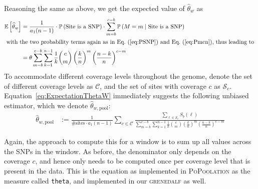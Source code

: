 \documentclass[a4paper,fontsize=9pt,DIV=14]{scrartcl}
\newcommand\toolname{\textsc}
\newcommand\eqnref[1]{Eq.~(\ref{#1})}
\newcommand{\samplesize}{n}
\newcommand{\coverage}{c}
\begin{document}
Reasoning the same as above, we get the expected value of $\widehat{\theta}_w$ as
%
\begin{align}
    \nonumber
    \mathbb{E}\left[\widehat{\theta}_w\right]
    &= \frac{1}{a_1(\samplesize-1)} \cdot \mathbb{P}\left(\text{Site is a SNP}\right)
        \cdot \sum_{m=b}^{\coverage-b} \mathbb{P}\left(M = m \mid \text{Site is a SNP}\right)
    \\
    \intertext{
        with the two probability terms again as in \eqnref{eq:PSNP} and \eqnref{eq:Pmcn}, thus leading to
    }
    \label{eq:ExpectationThetaW}
    &= \theta\sum_{m=b}^{\coverage-b}\sum_{k=1}^{n-1} \frac{1}{k} \binom{\coverage}{m} \left(\frac{k}{\samplesize}\right)^m \left(\frac{\samplesize-k}{\samplesize}\right)^{\coverage-m}
\end{align}
%
To accommodate different coverage levels throughout the genome, denote the set of different coverage levels as $\mathcal{C}$, and the set of sites with coverage $c$ as $\mathcal{S}_c$. Equation~\ref{eq:ExpectationThetaW} immediately suggests the following unbiased estimator, which we denote $\widehat{\theta}_{w, \text{pool}}$:
%
\begin{align}
    \label{eq:CorrectedThetaEstimate}
    \widehat{\theta}_{w, \text{pool}} &:= \frac{1}{\text{\# sites} \cdot a_1(n-1)}\sum_{c \in \mathcal{C}}
    \frac{
        \sum_{\ell \in \mathcal{S}_c} S_b(\ell)
    }{
         \sum_{m=b}^{\coverage-b}\sum_{k=1}^{n-1} \frac{1}{k} \binom{\coverage}{m} \left(\frac{k}{\samplesize}\right)^m \left(\frac{\samplesize-k}{\samplesize}\right)^{\coverage-m}
    }
\end{align}

Again, the approach to compute this for a window is to sum up all values across the SNPs in the window.  As before, the denominator only depends on the coverage $\coverage$, and hence only needs to be computed once per coverage level that is present in the data.  This is the equation as implemented in \toolname{PoPoolation} as the measure called \texttt{theta}, and implemented in our \toolname{grenedalf} as well.


\end{document}
